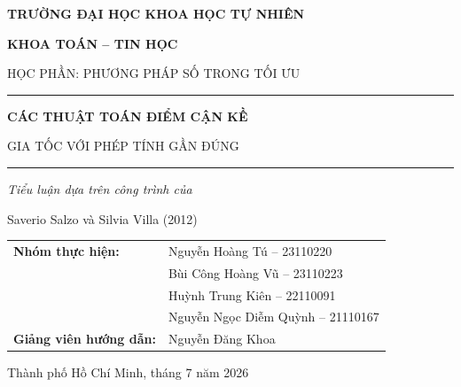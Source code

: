 \documentclass[12pt,twoside,a4paper,openany]{report}
\begin{document}
\begin{titlepage}
\thispagestyle{empty}
\begin{center}
{\large\bfseries TRƯỜNG ĐẠI HỌC KHOA HỌC TỰ NHIÊN\par}
\vspace{4pt}
{\large\bfseries KHOA TOÁN -- TIN HỌC\par}
\vspace{4pt}
{\normalsize HỌC PHẦN: PHƯƠNG PHÁP SỐ TRONG TỐI ƯU\par}

\vspace{1.5cm}
\rule{0.82\textwidth}{0.8pt}
\vspace{0.65cm}

{\fontsize{22}{28}\selectfont\bfseries
CÁC THUẬT TOÁN ĐIỂM CẬN KỀ\par
GIA TỐC VỚI PHÉP TÍNH GẦN ĐÚNG\par}

\vspace{0.65cm}
\rule{0.82\textwidth}{0.8pt}
\vspace{0.55cm}

{\large\itshape Tiểu luận dựa trên công trình của\par}
\vspace{3pt}
{\large Saverio Salzo và Silvia Villa (2012)\par}
\end{center}

\vfill

\begin{center}
\begin{minipage}{0.82\textwidth}
\renewcommand{\arraystretch}{1.35}
\begin{tabularx}{\textwidth}{@{}L{4.8cm}X@{}}
\textbf{Nhóm thực hiện:} & Nguyễn Hoàng Tú -- 23110220 \\
& Bùi Công Hoàng Vũ -- 23110223 \\
& Huỳnh Trung Kiên -- 22110091 \\
& Nguyễn Ngọc Diễm Quỳnh -- 21110167 \\[4pt]
\textbf{Giảng viên hướng dẫn:} & Nguyễn Đăng Khoa
\end{tabularx}
\end{minipage}
\end{center}

\vfill
\begin{center}
{\normalsize Thành phố Hồ Chí Minh, tháng 7 năm 2026}
\end{center}
\end{titlepage}
\newpage
\tableofcontents
\newpage
\setcounter{chapter}{0}
\setcounter{section}{0}

\nocite{salzo2012,rockafellar1976,guler1992,nesterov2004,beck2017,ryuyin2023,mordukhovich2014}












\end{document}
